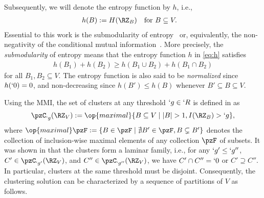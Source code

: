 Subsequently, we will denote the entropy function by $h$, i.e., 
\begin{align}
	h(B)&:=H(\RZ_B) && \text{for } B\subseteq V. \label{eq:h}
\end{align}
%
Essential to this work is the
submodularity of entropy~\cite{fujishige78}
or, equivalently,
the non-negativity of the conditional mutual information~\cite{shannon48}.
More precisely,
the \emph{submodularity} of entropy means that the entropy function $h$ in \eqref{eq:h} satisfies
\begin{align}
	h(B_1)+h(B_2)\geq h(B_1\cup B_2)+h(B_1\cap B_2)  \label{eq:submodular}
\end{align}
for all $B_1,B_2\subseteq V$.
The entropy function is also said to be \emph{normalized} since $h(`0)=0$, and non-decreasing since $h(B')\leq h(B)$ whenever $B' \subseteq B \subseteq V$.

%


Using the MMI, the set of clusters at any threshold $`g\in `R$ is defined in \cite{chan16cluster} as
\begin{align}
	\pzC_{`g}(\RZ_V):=\op{maximal}\{B\subseteq V \mid \abs {B} > 1, I(\RZ_B) > `g\},\label{eq:clusters}
\end{align}
where $\op{maximal}\pzF := \{B \in \pzF \mid \nexists B' \in \pzF, B \subsetneq B' \}$ denotes the
collection of inclusion-wise maximal elements of any collection $\pzF$ of subsets. It was shown in
\cite[Theorem~3]{chan16cluster} that the clusters form a laminar family, i.e.,
for any $`g' \leq `g''$, $C' \in \pzC_{`g'}(\RZ_V)$, and $C'' \in \pzC_{`g''}(\RZ_V)$, we have $C' \cap C'' = `0$ or $C' \supseteq C''$.
In particular, clusters at the same threshold must be disjoint. 
Consequently, the clustering solution can be characterized by a sequence of partitions of $V$ as follows.

